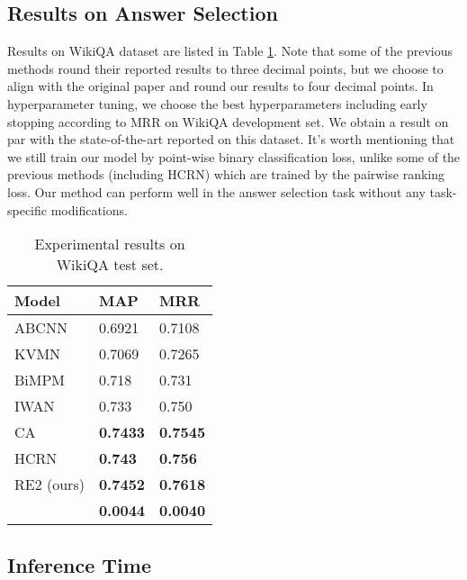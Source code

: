 \documentclass[11pt,a4paper]{article}
\begin{document}
\subsection{Results on Answer Selection}
Results on WikiQA dataset are listed in Table \ref{tab:wikiqa-result}. Note that some of the previous methods round their reported results to three decimal points, but we choose to align with the original paper \cite{wikiqa} and round our results to four decimal points. In hyperparameter tuning, we choose the best hyperparameters including early stopping according to MRR on WikiQA development set. We obtain a result on par with the state-of-the-art reported on this dataset. It's worth mentioning that we still train our model by point-wise binary classification loss, unlike some of the previous methods (including HCRN) which are trained by the pairwise ranking loss. Our method can perform well in the answer selection task without any task-specific modifications. 

\begin{table}
  \centering
  \small
  \begin{tabular}{|l|l|l|}
  \hline
  {\bf Model} & {\bf MAP} & {\bf MRR}\\\hline
  ABCNN \cite{yin2016abcnn} & 0.6921 & 0.7108 \\
  KVMN \cite{miller2016key} & 0.7069 & 0.7265 \\
  BiMPM \cite{wang2017bilateral} & 0.718 & 0.731 \\
  IWAN \cite{shen2017inter} & 0.733 & 0.750 \\
  CA \cite{wang2017compare} & {\bf 0.7433} & {\bf 0.7545} \\
  HCRN \cite{tay2018hermitian} & {\bf 0.743} & {\bf 0.756} \\\hline
  RE2 (ours) & {\bf 0.7452} & {\bf 0.7618}\\
  & {\bf 0.0044} & {\bf 0.0040}\\\hline
  \end{tabular}
  \caption{Experimental results on WikiQA test set.}\label{tab:wikiqa-result}
\end{table}

\subsection{Inference Time}
\end{document}
